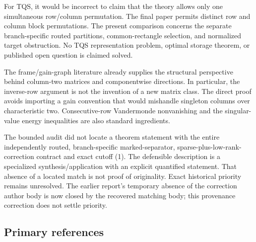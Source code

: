 \documentclass[
  11pt,
]{article}
\begin{document}
For TQS, it would be incorrect to claim that the theory allows only one
simultaneous row/column permutation. The final paper permits distinct
row and column block permutations. The present comparison concerns the
separate branch-specific routed partitions, common-rectangle selection,
and normalized target obstruction. No TQS representation problem,
optimal storage theorem, or published open question is claimed solved.

The frame/gain-graph literature already supplies the structural
perspective behind column-two matrices and componentwise directions. In
particular, the inverse-row argument is not the invention of a new
matrix class. The direct proof avoids importing a gain convention that
would mishandle singleton columns over characteristic two.
Consecutive-row Vandermonde nonvanishing and the singular-value energy
inequalities are also standard ingredients.

The bounded audit did not locate a theorem statement with the entire
independently routed, branch-specific marked-separator,
sparse-plus-low-rank-correction contract and exact cutoff (1). The
defensible description is a specialized synthesis/application with an
explicit quantified statement. That absence of a located match is not
proof of originality. Exact historical priority remains unresolved. The
earlier report's temporary absence of the correction author body is now
closed by the recovered matching body; this provenance correction does
not settle priority.

\subsection{Primary references}\label{primary-references}
\end{document}
